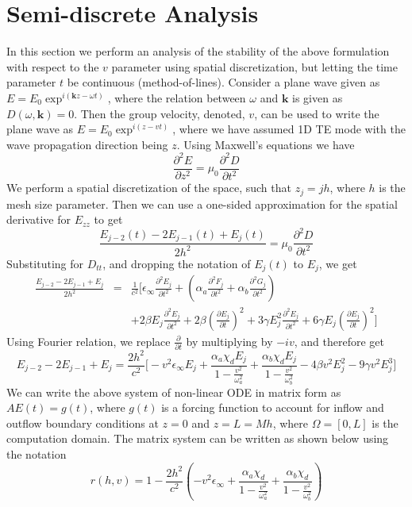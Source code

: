 \documentclass{article}[12pt]
\theoremstyle{plain}
\begin{document}
\section{Semi-discrete Analysis}
In this section we perform an analysis of the stability of the above formulation with respect to the $v$ parameter
using spatial discretization, but letting the time parameter $t$ be continuous (method-of-lines).
Consider a plane wave given as $E=E_0\exp^{i(\mathbf{k}z-\omega t)}$, where the relation between $\omega$ and $\mathbf{k}$ is
given as $D(\omega,\mathbf{k})=0$. Then the group velocity, denoted, $v$, can be used to write the plane wave as
$E=E_0\exp^{i(z-vt)}$, where we have assumed 1D TE mode with the wave propagation direction being $z$. Using Maxwell's equations
we have
\begin{equation}
\frac{\partial^2 E}{\partial z^2} = \mu_0 \frac{\partial^2 D}{\partial t^2}
\end{equation}
We perform a spatial discretization of the space, such that $z_j=jh$, where $h$ is the mesh size parameter. Then
we can use a one-sided approximation for the spatial derivative for $E_{zz}$ to get
\[
\frac{E_{j-2}(t) - 2E_{j-1}(t) + E_{j}(t)}{2h^2} = \mu_0 \frac{\partial^2 D}{\partial t^2}
\]
Substituting for $D_{tt}$, and dropping the notation of $E_j(t)$ to $E_j$, we get
\begin{eqnarray}
\frac{E_{j-2} - 2E_{j-1} + E_{j}}{2h^2} & = & \frac{1}{c^2} \Big[ \epsilon_\infty \frac{\partial^2 E_j}{\partial t^2}
+ (\alpha_a \frac{\partial^2 F_j}{\partial t^2}
+ \alpha_b \frac{\partial^2 G_j}{\partial t^2}) \nonumber \\
& & + 2 \beta E_j \frac{\partial^2 E_j}{\partial t^2} + 
2\beta (\frac{\partial E_j}{\partial t})^2 + 3\gamma E_j^2 \frac{\partial^2 E_j}{\partial t^2} +
6\gamma E_j (\frac{\partial E_j}{\partial t})^2\Big]
\end{eqnarray}
Using Fourier relation, we replace $\frac{\partial}{\partial t}$ by multiplying by $-iv$, and therefore get
\begin{equation}
E_{j-2} - 2E_{j-1} + E_{j}  = \frac{2h^2}{c^2}\Big[-v^2\epsilon_\infty E_j + \frac{\alpha_a \chi_d E_j}{1-\frac{v^2}{\omega_a^2}}
+ \frac{\alpha_b \chi_d E_j}{1-\frac{v^2}{\omega_b^2}} - 4\beta v^2 E_j^2 - 9\gamma v^2 E_j^3\Big]
\end{equation}
We can write the above system of non-linear ODE in matrix form as $AE(t)=g(t)$, where $g(t)$ is a forcing function to account
for inflow and outflow boundary conditions at $z=0$ and $z=L=Mh$, where $\Omega=[0,L]$ is the computation domain. The matrix
system can be written as shown below using the notation
\begin{equation}
r(h,v) = 1-\frac{2h^2}{c^2}(-v^2\epsilon_\infty + \frac{\alpha_a \chi_d }{1-\frac{v^2}{\omega_a^2}} 
+ \frac{\alpha_b \chi_d }{1-\frac{v^2}{\omega_b^2}}) \label{eqn:rhv}
\end{equation}
\end{document}
